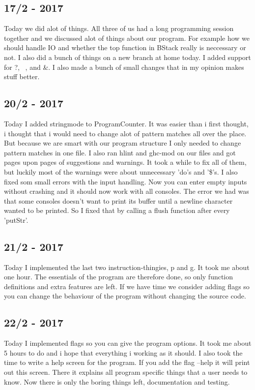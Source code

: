 \documentclass[12pt, a4paper]{article}
\begin{document}
\subsection*{17/2 - 2017}
Today we did alot of things. All three of us had a long programming session together
and we discussed alot of things about our program. For example how we should handle IO
and whether the top function in BStack really is neccessary or not.
I also did a bunch of things on a new branch at home today. I added support for
?, ~, and \&. I also made a bunch of small changes that in my opinion makes stuff better.

\subsection*{20/2 - 2017}
Today I added stringmode to ProgramCounter. It was easier than i first thought,
i thought that i would need to change alot of pattern matches all over the place.
But because we are smart with our program structure I only needed to change
pattern matches in one file. I also ran hlint and ghc-mod on our files and got
pages upon pages of suggestions and warnings. It took a while to fix all of them,
but luckily most of the warnings were about unnecessary 'do's and '\$'s. I also fixed
som small errors with the input handling. Now you can enter empty inputs without
crashing and it should now work with all consoles. The error we had was that some
consoles doesn't want to print its buffer until a newline character wanted to be printed.
So I fixed that by calling a flush function after every 'putStr'.

\subsection*{21/2 - 2017}
Today I implemented the last two instruction-thingies, p and g. It took me about
one hour. The essentials of the program are therefore done, so only function definitions
and extra features are left. If we have time we consider adding flags so you
can change the behaviour of the program without changing the source code.

\subsection*{22/2 - 2017}
Today I implemented flags so you can give the program options. It took me about
5 hours to do and i hope that everything i working as it should. I also took
the time to write a help screen for the program. If you add the flag --help
it will print out this screen. There it explains all program specific things
that a user needs to know.
Now there is only the boring things left, documentation and testing.
\end{document}
